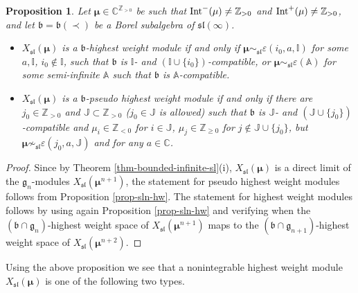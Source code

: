 \documentclass[12pt]{amsart}
\newcommand{\C}{{\mathbb C}}
\newcommand{\Z}{{\mathbb Z}}
\def\gb{\mathfrak{b}}
\def\gg{\mathfrak{g}}
\def\Z{\mathbb{Z}}
\newtheorem{prop}[thm]{Proposition}
\begin{document}
 
\begin{prop} \label{prop-hw-sl-infty} Let $\boldsymbol{\mu} \in {\mathbb C}^{{\mathbb Z}_{>0}}$ be such that ${\rm Int}^- (\mu) \neq \Z_{>0}$ and ${\rm Int}^+ (\mu) \neq  \Z_{>0}$,  and let $\gb = \gb (\prec)$ be a Borel subalgebra of  $\mathfrak{sl} (\infty)$. 

\begin{itemize}
\item[(i)]  $X_{\mathfrak{sl}} (\boldsymbol{\mu})$  is a $\mathfrak b$-highest weight module if and only if $\boldsymbol{\mu} \sim_{\mathfrak{sl}} \varepsilon (i_0,a, \mathbb I)$ for some $a, \mathbb I$, $i_0 \notin \mathbb I$, such that $\gb$ is $\mathbb I$- and $(\mathbb I \cup \{ i_0\})$-compatible, or  $\boldsymbol{\mu} \sim_{\mathfrak{sl}} \varepsilon ({\mathbb A})$ for some semi-infinite  ${\mathbb A}$ such that $\gb$ is ${\mathbb A}$-compatible.
\item[(ii)]  $X_{\mathfrak{sl}} (\boldsymbol{\mu})$  is a $\mathfrak b$-pseudo highest weight module if and only if there are $j_0 \in \Z_{>0}$ and $\mathbb J \subset \Z_{>0}$ ($j_0 \in \mathbb J$ is allowed) such that $\gb$ is  $\mathbb J$- and $(\mathbb J \cup \{ j_0\})$-compatible and  $\mu_i \in \Z_{< 0}$ for $i \in \mathbb J$, $\mu_j \in \Z_{\geq 0}$ for $j \notin \mathbb J \cup \{ j_0 \}$, but $\boldsymbol{\mu} \not\sim_{\mathfrak{sl}} \varepsilon (j_0,a, \mathbb J)$ and for any $a \in \C$.
\end{itemize}
\end{prop}
\begin{proof}
Since by Theorem \ref{thm-bounded-infinite-sl}(i), $X_{\mathfrak{sl}} (\boldsymbol{\mu})$ is a direct limit of the $\gg_n$-modules $X_{\mathfrak{sl}} (\boldsymbol{\mu}^{n+1})$, the statement for  pseudo highest weight modules follows from Proposition \ref{prop-sln-hw}. The statement for highest weight  modules follows by using again Proposition \ref{prop-sln-hw} and verifying when  the $(\gb \cap \gg_n)$-highest weight space of $X_{\mathfrak{sl}} (\boldsymbol{\mu}^{n+1})$ maps to the $(\gb \cap \gg_{n+1})$-highest weight space of $X_{\mathfrak{sl}} (\boldsymbol{\mu}^{n+2})$. 
\end{proof}

Using the above proposition we see that a nonintegrable highest weight module $X_{\mathfrak{sl}}(\boldsymbol{\mu})$ is one of the following two types.
\end{document}
